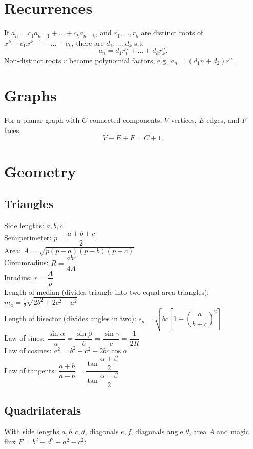 \section{Recurrences}
If $a_n = c_1 a_{n-1} + \dots + c_k a_{n-k}$, and $r_1, \dots, r_k$ are distinct roots of $x^k - c_1 x^{k-1} - \dots - c_k$, there are $d_1, \dots, d_k$ s.t.
\[a_n = d_1r_1^n + \dots + d_kr_k^n. \]
Non-distinct roots $r$ become polynomial factors, e.g. $a_n = (d_1n + d_2)r^n$.

\section{Graphs}
For a planar graph with $C$ connected components, $V$ vertices, $E$ edges, and $F$ faces,
\[V-E+F=C+1.\]

\section{Geometry}

\subsection{Triangles}
Side lengths: $a,b,c$\\
Semiperimeter: $p=\dfrac{a+b+c}{2}$\\
Area: $A=\sqrt{p(p-a)(p-b)(p-c)}$\\
Circumradius: $R=\dfrac{abc}{4A}$\\
Inradius: $r=\dfrac{A}{p}$\\
Length of median (divides triangle into two equal-area triangles): $m_a=\tfrac{1}{2}\sqrt{2b^2+2c^2-a^2}$\\
Length of bisector (divides angles in two): $s_a=\sqrt{bc\left[1-\left(\dfrac{a}{b+c}\right)^2\right]}$\\
Law of sines: $\dfrac{\sin\alpha}{a}=\dfrac{\sin\beta}{b}=\dfrac{\sin\gamma}{c}=\dfrac{1}{2R}$\\
Law of cosines: $a^2=b^2+c^2-2bc\cos\alpha$\\
Law of tangents: $\dfrac{a+b}{a-b}=\dfrac{\tan\dfrac{\alpha+\beta}{2}}{\tan\dfrac{\alpha-\beta}{2}}$\\

\subsection{Quadrilaterals}
With side lengths $a,b,c,d$, diagonals $e, f$, diagonals angle $\theta$, area $A$ and
magic flux $F=b^2+d^2-a^2-c^2$:

